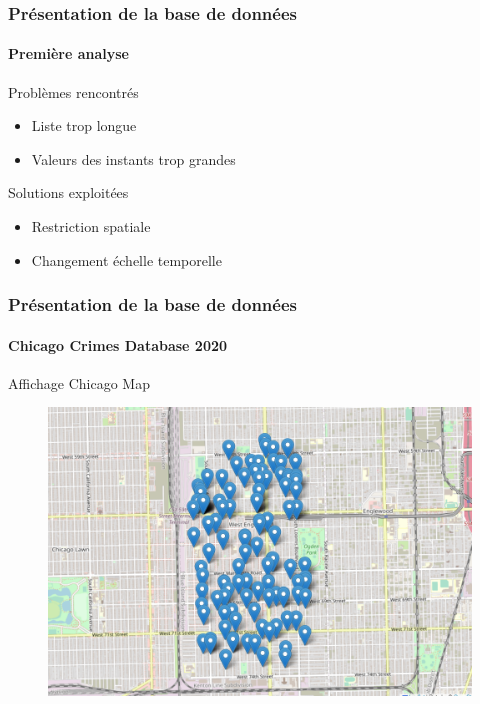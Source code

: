 \begin{frame}
	\frametitle{Présentation de la base de données}
	\framesubtitle{Première analyse}
\begin{alertblock}{Problèmes rencontrés}
\begin{itemize}
            \item Liste trop longue 
            \item Valeurs des instants trop grandes
            \end{itemize}
	\end{alertblock}

 \begin{block}{Solutions exploitées}
 \begin{itemize}
            \item Restriction spatiale
            \item Changement échelle temporelle
            \end{itemize}
	\end{block}
\end{frame}

\begin{frame}
	\frametitle{Présentation de la base de données}
	\framesubtitle{Chicago Crimes Database 2020}
         \begin{block}{Affichage Chicago Map}
		\begin{figure}
			    \centering
				\includegraphics[width=0.8\linewidth]{figures/MAP.png}
			
		\end{figure}
  \end{block}
\end{frame}

